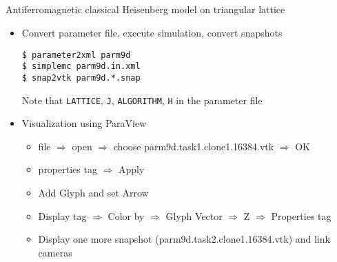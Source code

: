 \subsection*{\redb\whiteb\greenm}
\begin{frame}[t,fragile]{Antiferromagnetic classical Heisenberg model on triangular lattice}
  \begin{itemize}
  \item Convert parameter file, execute simulation, convert snapshots
\begin{lstlisting}
$ parameter2xml parm9d
$ simplemc parm9d.in.xml
$ snap2vtk parm9d.*.snap
\end{lstlisting}
Note that \verb+LATTICE+, \verb+J+, \verb+ALGORITHM+, \verb+H+ in the parameter file
  \item Visualization using ParaView
    \begin{itemize}
      \item file $\Rightarrow$ open $\Rightarrow$ choose parm9d.task1.clone1.16384.vtk $\Rightarrow$  OK
      \item properties tag $\Rightarrow$ Apply
      \item Add Glyph and set Arrow
      \item Display tag $\Rightarrow$ Color by $\Rightarrow$ Glyph Vector $\Rightarrow$ Z $\Rightarrow$ Properties tag
      \item Display one more snapshot (parm9d.task2.clone1.16384.vtk) and link cameras
    \end{itemize}
  \end{itemize}
\end{frame}


